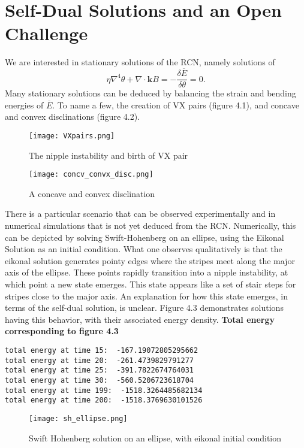 \documentclass[12pt]{article}
\numberwithin{equation}{section}
\begin{document}
\section{Self-Dual Solutions and an Open Challenge}
\par We are interested in stationary solutions of the RCN, namely solutions of
\begin{equation}
    \eta \nabla^4 \theta + \nabla \cdot \bm{k}B = -\frac{\delta \overline{E}}{\delta \theta} = 0.
\end{equation}
Many stationary solutions can be deduced by balancing the strain and bending energies of $\overline{E}$. To name a few, the creation of VX pairs (figure 4.1), and concave and convex disclinations (figure 4.2).
\begin{figure}
\centering
\texttt{[image: VXpairs.png]}
\caption{The nipple instability and birth of VX pair}
\end{figure}
\begin{figure}
\centering
\texttt{[image: concv\_convx\_disc.png]}
\caption{A concave and convex disclination}
\end{figure}
\par There is a particular scenario that can be observed experimentally and in numerical simulations that is not yet deduced from the RCN. Numerically, this can be depicted by solving Swift-Hohenberg on an ellipse, using the Eikonal Solution as an initial condition. What one observes qualitatively is that the eikonal solution generates pointy edges where the stripes meet along the major axis of the ellipse. These points rapidly transition into a nipple instability, at which point a new state emerges. This state appears like a set of stair steps for stripes close to the major axis. An explanation for how this state emerges, in terms of the self-dual solution, is unclear. Figure 4.3 demonstrates solutions having this behavior, with their associated energy density.\newline
\textbf{Total energy corresponding to figure 4.3}
\begin{verbatim}
total energy at time 15:  -167.19072805295662
total energy at time 20:  -261.4739829791277
total energy at time 25:  -391.7822674764031
total energy at time 30:  -560.5206723618704
total energy at time 199:  -1518.3264485682134
total energy at time 200:  -1518.3769630101526
\end{verbatim}
\begin{figure}
\centering
\texttt{[image: sh\_ellipse.png]}
\caption{Swift Hohenberg solution on an ellipse, with eikonal initial condition}
\end{figure}
\end{document}
